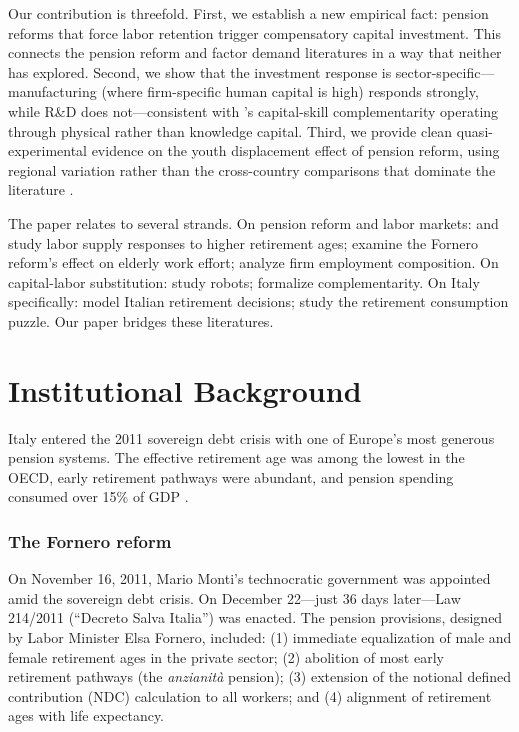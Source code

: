 \documentclass[12pt]{article}
\begin{document}
Our contribution is threefold. First, we establish a new empirical fact: pension reforms that force labor retention trigger compensatory capital investment. This connects the pension reform and factor demand literatures in a way that neither has explored. Second, we show that the investment response is sector-specific---manufacturing (where firm-specific human capital is high) responds strongly, while R\&D does not---consistent with \citet{griliches1969}'s capital-skill complementarity operating through physical rather than knowledge capital. Third, we provide clean quasi-experimental evidence on the youth displacement effect of pension reform, using regional variation rather than the cross-country comparisons that dominate the literature \citep{gruber1999}.

The paper relates to several strands. On pension reform and labor markets: \citet{staubli2013} and \citet{cribb2016} study labor supply responses to higher retirement ages; \citet{carta2021} examine the Fornero reform's effect on elderly work effort; \citet{ferrara2021} analyze firm employment composition. On capital-labor substitution: \citet{acemoglu2010} study robots; \citet{krusell2000} formalize complementarity. On Italy specifically: \citet{belloni2013} model Italian retirement decisions; \citet{battistin2009} study the retirement consumption puzzle. Our paper bridges these literatures.


\section{Institutional Background}

Italy entered the 2011 sovereign debt crisis with one of Europe's most generous pension systems. The effective retirement age was among the lowest in the OECD, early retirement pathways were abundant, and pension spending consumed over 15\% of GDP \citep{oecd2018it}.

\subsubsection*{The Fornero reform} On November 16, 2011, Mario Monti's technocratic government was appointed amid the sovereign debt crisis. On December 22---just 36 days later---Law 214/2011 (``Decreto Salva Italia'') was enacted. The pension provisions, designed by Labor Minister Elsa Fornero, included: (1) immediate equalization of male and female retirement ages in the private sector; (2) abolition of most early retirement pathways (the \textit{anzianit\`a} pension); (3) extension of the notional defined contribution (NDC) calculation to all workers; and (4) alignment of retirement ages with life expectancy.
\end{document}
